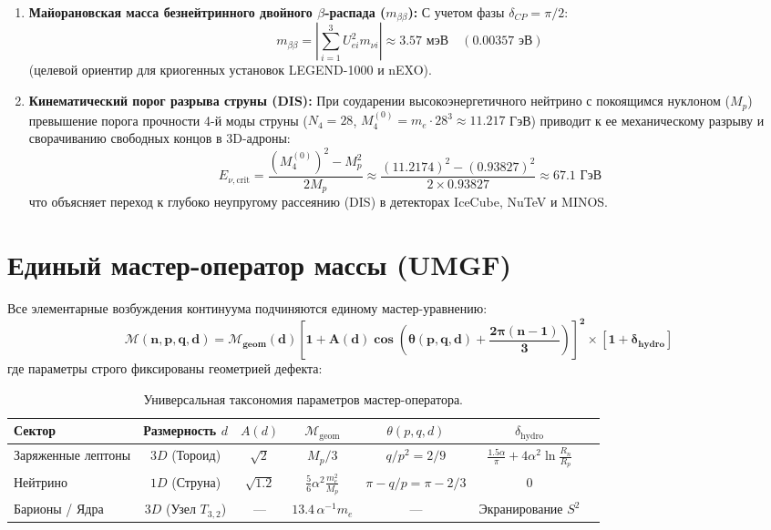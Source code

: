 \documentclass[12pt,a4paper]{article}
\begin{document}
\begin{enumerate}
	\item \textbf{Майорановская масса безнейтринного двойного $\beta$-распада ($m_{\beta\beta}$):}
	С учетом фазы $\delta_{CP} = \pi/2$:
	\begin{equation}
		m_{\beta\beta} = \left| \sum_{i=1}^3 U_{ei}^2 m_{\nu i} \right| \approx \mathbf{3.57 \text{ мэВ}} \quad (0.00357 \text{ эВ})
	\end{equation}
	(целевой ориентир для криогенных установок LEGEND-1000 и nEXO).
	
	\item \textbf{Кинематический порог разрыва струны (DIS):}
	При соударении высокоэнергетичного нейтрино с покоящимся нуклоном ($M_p$) превышение порога прочности 4-й моды струны ($N_4 = 28$, $M_4^{(0)} = m_e \cdot 28^3 \approx 11.217$ ГэВ) приводит к ее механическому разрыву и сворачиванию свободных концов в 3D-адроны:
	\begin{equation}
		E_{\nu, \text{crit}} = \frac{(M_4^{(0)})^2 - M_p^2}{2 M_p} \approx \frac{(11.2174)^2 - (0.93827)^2}{2 \times 0.93827} \approx \mathbf{67.1 \text{ ГэВ}}
	\end{equation}
	что объясняет переход к глубоко неупругому рассеянию (DIS) в детекторах IceCube, NuTeV и MINOS.
\end{enumerate}
	
	\section{Единый мастер-оператор массы (UMGF)}
	
	Все элементарные возбуждения континуума подчиняются единому мастер-уравнению:
	\begin{equation}
		\mathbf{\mathcal{M}(n, p, q, d) = \mathcal{M}_{\text{geom}}(d) \left[ 1 + A(d) \cos\left( \theta(p,q,d) + \frac{2\pi(n-1)}{3} \right) \right]^2 \times \left[ 1 + \delta_{\text{hydro}} \right]}
	\end{equation}
	где параметры строго фиксированы геометрией дефекта:
	
	\begin{table}[h!]
		\centering
		\small
		\begin{tabular}{lcccccc}
			\toprule
			\textbf{Сектор} & \textbf{Размерность $d$} & $A(d)$ & $\mathcal{M}_{\text{geom}}$ & $\theta(p,q,d)$ & $\delta_{\text{hydro}}$ \\
			\midrule
			Заряженные лептоны & $3D$ (Тороид) & $\sqrt{2}$ & $M_p/3$ & $q/p^2 = 2/9$ & $\frac{1.5\alpha}{\pi} + 4\alpha^2\ln\frac{R_n}{R_p}$ \\
			Нейтрино & $1D$ (Струна) & $\sqrt{1.2}$ & $\frac{5}{6}\alpha^2\frac{m_e^2}{M_p}$ & $\pi - q/p = \pi - 2/3$ & $0$ \\
			Барионы / Ядра & $3D$ (Узел $T_{3,2}$) & --- & $13.4\,\alpha^{-1} m_e$ & --- & Экранирование $S^2$ \\
			\bottomrule
		\end{tabular}
		\caption{Универсальная таксономия параметров мастер-оператора.}
	\end{table}
	
\end{document}
